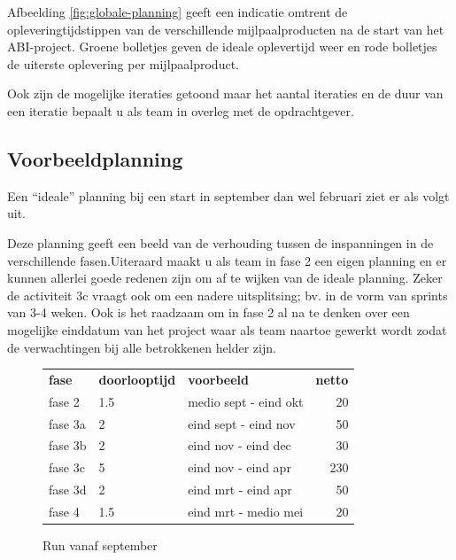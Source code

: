 Afbeelding \ref{fig:globale-planning} geeft een indicatie omtrent de
opleveringtijdstippen van de verschillende mijlpaalproducten na de
start van het ABI-project. Groene bolletjes geven de ideale
oplevertijd weer en rode bolletjes de uiterste oplevering
per mijlpaalproduct.

Ook zijn de mogelijke iteraties getoond maar het aantal
iteraties en de duur van een iteratie bepaalt u als team
in overleg met de opdrachtgever.

\subsection{Voorbeeldplanning}
Een ``ideale'' planning bij een start in september dan wel februari
ziet er als volgt uit.

Deze planning geeft een beeld van de verhouding tussen de inspanningen
in de verschillende fasen.Uiteraard maakt u als team in fase 2 een eigen
planning en er kunnen allerlei goede redenen zijn om af te wijken van
de ideale planning. Zeker de activiteit 3c vraagt ook om een nadere
uitsplitsing; bv. in de vorm van sprints van 3-4 weken. Ook is het
raadzaam om in fase 2 al na te denken over een mogelijke einddatum
van het project waar als team naartoe gewerkt wordt zodat de verwachtingen
bij alle betrokkenen helder zijn.



\begin{figure}[htp]
 \centering
\begin{tabular}{lllr}
\textbf{fase} & \textbf{doorlooptijd} & \textbf{voorbeeld} & \textbf{netto}\\
fase 2        & 1.5  & medio sept - eind okt & 20\\
fase 3a       & 2    & eind sept - eind nov & 50\\
fase 3b       & 2    & eind nov - eind dec & 30\\
fase 3c       & 5    & eind nov - eind apr & 230\\
fase 3d       & 2    & eind mrt - eind apr & 50\\
fase 4        & 1.5  & eind mrt - medio mei & 20\\
\end{tabular}

 \caption{Run vanaf september}
 \label{fig:sept-run}
\end{figure}

